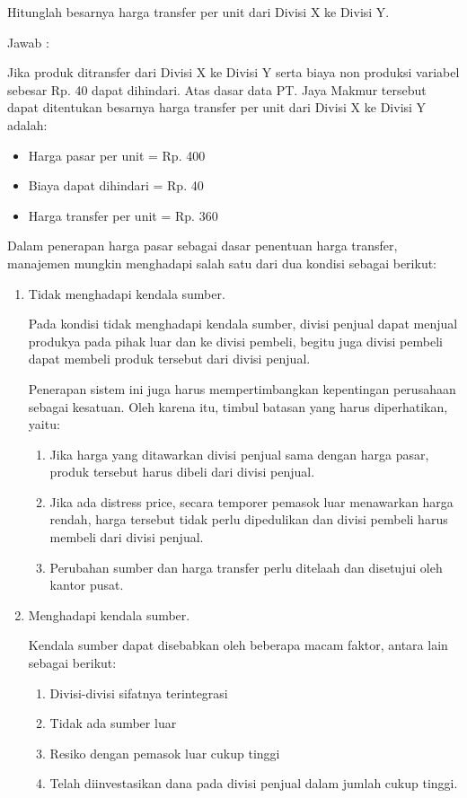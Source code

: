\begin{enumerate}
	Hitunglah besarnya harga transfer per unit dari Divisi X ke Divisi Y.

	Jawab :

	Jika produk ditransfer dari Divisi X ke Divisi Y serta biaya non produksi variabel sebesar Rp. 40 dapat dihindari. Atas dasar data PT. Jaya Makmur tersebut dapat ditentukan besarnya harga transfer per unit dari Divisi X ke Divisi Y adalah:
	
	\begin{itemize}
		\item Harga pasar per unit = Rp. 400
		\item Biaya dapat dihindari = Rp. 40
		\item Harga transfer per unit = Rp. 360
	\end{itemize}

	Dalam penerapan harga pasar sebagai dasar penentuan harga transfer, manajemen mungkin menghadapi salah satu dari dua kondisi sebagai berikut:

	\begin{enumerate}
		\item Tidak menghadapi kendala sumber.
		
		Pada kondisi tidak menghadapi kendala sumber, divisi penjual dapat menjual produkya pada pihak luar dan ke divisi pembeli, begitu juga divisi pembeli dapat membeli produk tersebut dari divisi penjual.

		Penerapan sistem ini juga harus mempertimbangkan kepentingan perusahaan sebagai kesatuan. Oleh karena itu, timbul batasan yang harus diperhatikan, yaitu:

		\begin{enumerate}
			\item Jika harga yang ditawarkan divisi penjual sama dengan harga pasar, produk tersebut harus dibeli dari divisi penjual.
			\item Jika ada distress price, secara temporer pemasok luar menawarkan harga rendah, harga tersebut tidak perlu dipedulikan dan divisi pembeli harus membeli dari divisi penjual.
			\item Perubahan sumber dan harga transfer perlu ditelaah dan disetujui oleh kantor pusat.
		\end{enumerate}

		\item Menghadapi kendala sumber.
		
		Kendala sumber dapat disebabkan oleh beberapa macam faktor, antara lain sebagai berikut:

		\begin{enumerate}
			\item Divisi-divisi sifatnya terintegrasi
			\item Tidak ada sumber luar
			\item Resiko dengan pemasok luar cukup tinggi
			\item Telah diinvestasikan dana pada divisi penjual dalam jumlah cukup tinggi.
		\end{enumerate}


\end{enumerate}
\end{enumerate}
